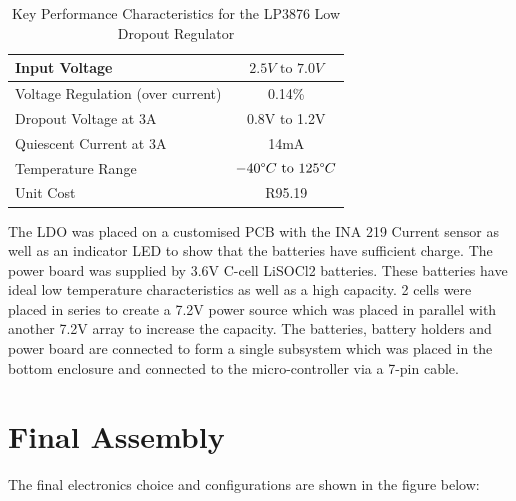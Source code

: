 \begin{table}[H]
	\centering
	\caption{Key Performance Characteristics for the LP3876 Low Dropout Regulator}
	\begin{tabular}{|l|c|}
		\hline
		Input Voltage & $2.5V \text{ to } 7.0V$  \\
		\hline
		Voltage Regulation (over current)& 0.14\%\\
		\hline
		Dropout Voltage at 3A & 0.8V to 1.2V  \\
		\hline
		Quiescent Current at 3A &  14mA\\
		\hline
		Temperature Range & $-40 \degree C \text{ to }125 \degree C$\\
		\hline
		Unit Cost & R95.19 \footnotemark\\
		\hline
	\end{tabular}    
	\label{tab:lp_spec}
\end{table}


The LDO was placed on a customised PCB  with the INA 219 Current sensor as well as an indicator LED to show that the batteries have sufficient charge. The power board was supplied by 3.6V C-cell LiSOCl2 batteries. These batteries have ideal low temperature characteristics as well as a high capacity. 2 cells were placed in series to create a 7.2V power source which was placed in parallel with another 7.2V array to increase the capacity. The batteries, battery holders and power board are connected to form a single subsystem which was placed in the bottom enclosure and connected to the micro-controller via a 7-pin cable.

\section{Final Assembly}
\label{sec:ch3_final_assembly}
The final electronics choice and configurations are shown in the figure below:

